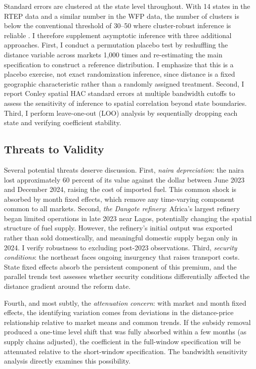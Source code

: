 \documentclass[12pt]{article}
\begin{document}
Standard errors are clustered at the state level throughout. With 14 states in the RTEP data and a similar number in the WFP data, the number of clusters is below the conventional threshold of 30--50 where cluster-robust inference is reliable \citep{Cameron2008}. I therefore supplement asymptotic inference with three additional approaches. First, I conduct a permutation placebo test by reshuffling the distance variable across markets 1,000 times and re-estimating the main specification to construct a reference distribution. I emphasize that this is a placebo exercise, not exact randomization inference, since distance is a fixed geographic characteristic rather than a randomly assigned treatment. Second, I report Conley spatial HAC standard errors \citep{Conley1999} at multiple bandwidth cutoffs to assess the sensitivity of inference to spatial correlation beyond state boundaries. Third, I perform leave-one-out (LOO) analysis by sequentially dropping each state and verifying coefficient stability.

\subsection{Threats to Validity}

Several potential threats deserve discussion. First, \textit{naira depreciation}: the naira lost approximately 60 percent of its value against the dollar between June 2023 and December 2024, raising the cost of imported fuel. This common shock is absorbed by month fixed effects, which remove any time-varying component common to all markets. Second, \textit{the Dangote refinery}: Africa's largest refinery began limited operations in late 2023 near Lagos, potentially changing the spatial structure of fuel supply. However, the refinery's initial output was exported rather than sold domestically, and meaningful domestic supply began only in 2024. I verify robustness to excluding post-2023 observations. Third, \textit{security conditions}: the northeast faces ongoing insurgency that raises transport costs. State fixed effects absorb the persistent component of this premium, and the parallel trends test assesses whether security conditions differentially affected the distance gradient around the reform date.

Fourth, and most subtly, the \textit{attenuation concern}: with market and month fixed effects, the identifying variation comes from deviations in the distance-price relationship relative to market means and common trends. If the subsidy removal produced a one-time level shift that was fully absorbed within a few months (as supply chains adjusted), the coefficient in the full-window specification will be attenuated relative to the short-window specification. The bandwidth sensitivity analysis directly examines this possibility.
\end{document}
